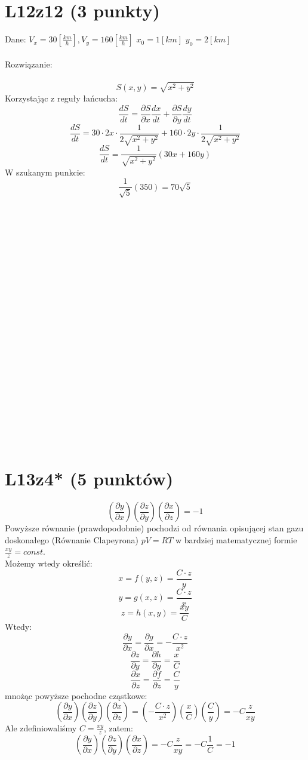 \documentclass{article}
\begin{document}
\section{L12z12 (3 punkty)}
Dane: $V_x = 30 [\frac{km}{h}],V_y = 160 [\frac{km}{h}]$ $x_0 = 1 [km]$ $y_0 = 2 [km]$\\\\Rozwiązanie:\\\\
$$S(x,y) = \sqrt{x^2 + y^2}$$
Korzystając z reguły łańcucha:
$$\frac{dS}{dt} = \frac{\partial S}{\partial x} \frac{dx}{dt} + \frac{\partial S}{\partial y} \frac{dy}{dt}$$
$$\frac{dS}{dt} = 30 \cdot 2x \cdot \frac{1}{2\sqrt{x^2 + y^2}} + 160 \cdot 2y \cdot \frac{1}{2\sqrt{x^2 + y^2}}$$
$$\frac{dS}{dt} = \frac{1}{\sqrt{x^2 + y^2}} (30x + 160y)$$
W szukanym punkcie:
$$
\frac{1}{\sqrt{5}} (350) = 70 \sqrt5
$$\\\\\\\\\\\\\\\\\\\\\\\\\\\\\\\\\\\\\\\\\\
\section{L13z4* (5 punktów)}
$$
\left ( \frac{\partial y}{\partial x} \right )\left ( \frac{\partial z}{\partial y} \right )\left ( \frac{\partial x}{\partial z} \right ) = -1
$$
Powyższe równanie (prawdopodobnie) pochodzi od równania opisującej stan gazu doskonałego (Równanie Clapeyrona) $pV = RT$ w bardziej matematycznej formie $\frac{xy}{z} = const$.\\Możemy wtedy określić:
$$
x = f(y,z) = \frac{C\cdot z}{y}
$$
$$
y = g(x,z) = \frac{C\cdot z}{x}
$$
$$
z = h(x,y) = \frac{xy}{C}
$$
Wtedy:
$$
\frac{\partial y}{\partial x} = \frac{\partial g}{\partial x} = -\frac{C \cdot z}{x^2}
$$
$$
\frac{\partial z}{\partial y} = \frac{\partial h}{\partial y} = \frac{x}{C}
$$
$$
\frac{\partial x}{\partial z} = \frac{\partial f}{\partial z} = \frac{C}{y}
$$
mnożąc powyższe pochodne cząstkowe:
$$
\left ( \frac{\partial y}{\partial x} \right )\left ( \frac{\partial z}{\partial y} \right )\left ( \frac{\partial x}{\partial z} \right )  = \left ( -\frac{C \cdot z}{x^2} \right) \left( \frac{x}{C}\right) \left( \frac{C}{y}\right) = -C\frac{z}{xy}
$$
Ale zdefiniowaliśmy $C = \frac{xy}{z}$, zatem:
$$
\left ( \frac{\partial y}{\partial x} \right )\left ( \frac{\partial z}{\partial y} \right )\left ( \frac{\partial x}{\partial z} \right ) = -C\frac{z}{xy} = -C\frac{1}{C} = -1
$$
\end{document}
